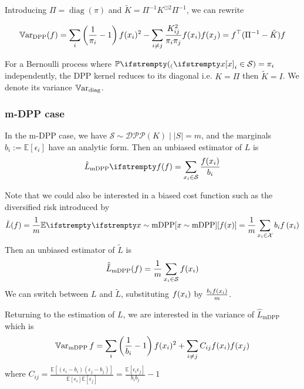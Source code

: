 Introducing $\Pi = \operatorname{diag}(\pi)$ and $\tilde K = \Pi^{-1}K^{\odot 2} \Pi^{-1}$, we can rewrite  

\begin{equation}
	\operatorname{\mathbb V ar}_{\textrm{DPP}}({f})=\sum_{i}\left(\frac{1}{\pi_{i}}-1\right) f(x_{i})^{2}-\sum_{i \neq j} \frac{K_{ij}^{2}}{\pi_{i} \pi_{j}} f(x_{i}) f(x_{j}) =  f^\top (\Pi^{-1}  - \tilde{K}) f 
\end{equation}

For a Bernoulli process where $\PP(x_i \in \mathcal S) = \pi_i$ independently, the DPP kernel reduces to its diagonal i.e. $K = \Pi$ then $\tilde K = I$. We denote its variance $\operatorname{\mathbb V ar}_{\textrm{diag}}$.


\subsubsection{m-DPP case}

In the m-DPP case, we have $\mathcal S \sim \mathcal{DPP}(K) \mid |S|=m$, and the marginals $b_{i} := \mathbb{E}\left[\epsilon_{i}\right]$ have an analytic form. Then an unbiased estimator of $L$ is
\begin{equation*}
	\estloss{\textrm{mDPP}}{\query} = \sum_{x_i\in \mathcal S} \frac{\query(x_i)}{b_i}
\end{equation*}

Note that we could also be interested in a biased cost function such as the diversified risk introduced by \cite{zhang2017dppminibatch}
$$
\tilde L({\query}) =\frac{1}{m}\EE{}{x \sim \textrm{mDPP}}[\query(x)]=\frac{1}{m}\sum_{x_i \in \mathcal X} b_{i} \query\left(x_{i}\right)
$$
Then an unbiased estimator of $\tilde L$ is
\begin{equation*}
	\hat{\tilde L}_{\textrm{mDPP}}({f}) = \frac{1}{m}\sum_{x_i\in \mathcal S} f(x_i)
\end{equation*}
We can switch between $L$ and $\tilde L$, substituting $f(x_i)$ by $\frac{b_i f(x_i)}{m}$.

Returning to the estimation of $L$, we are interested in the variance of $\hat L_{\textrm{mDPP}}$ which is
\begin{equation}
	\operatorname{\mathbb V ar}_{\textrm{mDPP}}{f}=\sum_{i}\left(\frac{1}{b_i}-1\right) f(x_i)^2
	+ \sum_{i \neq j} C_{ij}f(x_i) f(x_j)
\end{equation}
where $C_{ij}=\frac{\mathbb{E}\left[\left(\epsilon_{i}-b_{i}\right)\left(\epsilon_{j}-b_{j}\right)\right]}{\mathbb{E}\left[\epsilon_{i}\right] \mathbb{E}\left[\epsilon_{j}\right]}=\frac{\mathbb{E}\left[\epsilon_{i} \epsilon_{j}\right]}{b_{i} b_{j}}-1
$

